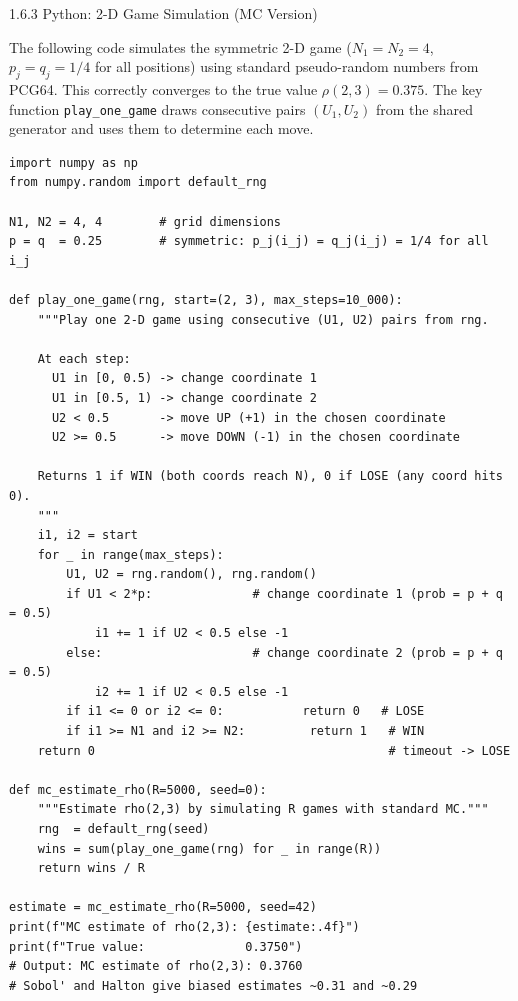 \documentclass[aspectratio=169,10pt]{beamer}
\begin{document}
\begin{frame}[fragile]{1.6.3 Python: 2-D Game Simulation (MC Version)}

  The following code simulates the symmetric 2-D game ($N_1 = N_2 = 4$,
  $p_j = q_j = 1/4$ for all positions) using standard pseudo-random numbers
  from PCG64.  This correctly converges to the true value $\rho(2,3) = 0.375$.
  The key function \texttt{play\_one\_game} draws consecutive pairs $(U_1, U_2)$
  from the shared generator and uses them to determine each move.

\begin{lstlisting}[style=python]
import numpy as np
from numpy.random import default_rng

N1, N2 = 4, 4        # grid dimensions
p = q  = 0.25        # symmetric: p_j(i_j) = q_j(i_j) = 1/4 for all i_j

def play_one_game(rng, start=(2, 3), max_steps=10_000):
    """Play one 2-D game using consecutive (U1, U2) pairs from rng.

    At each step:
      U1 in [0, 0.5) -> change coordinate 1
      U1 in [0.5, 1) -> change coordinate 2
      U2 < 0.5       -> move UP (+1) in the chosen coordinate
      U2 >= 0.5      -> move DOWN (-1) in the chosen coordinate

    Returns 1 if WIN (both coords reach N), 0 if LOSE (any coord hits 0).
    """
    i1, i2 = start
    for _ in range(max_steps):
        U1, U2 = rng.random(), rng.random()
        if U1 < 2*p:              # change coordinate 1 (prob = p + q = 0.5)
            i1 += 1 if U2 < 0.5 else -1
        else:                     # change coordinate 2 (prob = p + q = 0.5)
            i2 += 1 if U2 < 0.5 else -1
        if i1 <= 0 or i2 <= 0:           return 0   # LOSE
        if i1 >= N1 and i2 >= N2:         return 1   # WIN
    return 0                                         # timeout -> LOSE

def mc_estimate_rho(R=5000, seed=0):
    """Estimate rho(2,3) by simulating R games with standard MC."""
    rng  = default_rng(seed)
    wins = sum(play_one_game(rng) for _ in range(R))
    return wins / R

estimate = mc_estimate_rho(R=5000, seed=42)
print(f"MC estimate of rho(2,3): {estimate:.4f}")
print(f"True value:              0.3750")
# Output: MC estimate of rho(2,3): 0.3760
# Sobol' and Halton give biased estimates ~0.31 and ~0.29
\end{lstlisting}

\end{frame}
\end{document}
